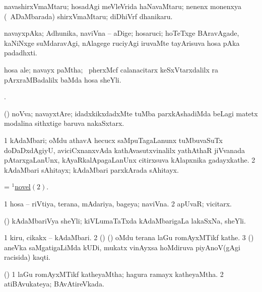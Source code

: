 \bentry
{}
\gl{\nA}
\bmng
navashirxVmaMtaru; hosadAgi meVleVrida haNavaMtaru; nenenx monenxya (\kanmu\ ADaMbarada) shirxVmaMtaru; diDhiVrf dhanikaru. 
\emng
\eentry

\bentry
{}
\gl{\nA}
\expl{\F}
\bmng
navayxpAka; Adhunika, naviVna -- aDige; hosaruci; hoTeTxge BAravAgade, kaNiNxge suMdaravAgi, nAlagege ruciyAgi iruvaMte tayArisuva hosa pAka padadhxti. 
\emng
\eentry

\bentry
{}
\gl{\nA}
\expl{\F}
\bmng
hosa ale; navayx paMtha; \kanmu\ pherxMcf calanacitarx keSxVtarxdalilx {}ra pArxraMBadalilx baMda hosa sheYli. 
\emng
\eentry

\bentry
{}
\gl{\saMkiSx}
\bmng
{}. 
\emng
\eentry

\bentry
{}
\gl{\nA}
\bmng
(\Kavi) noVva; navayxtAre; idadxkikxdadxMte tuMba parxkAshadiMda beLagi matetx modalina sithxtige baruva nakaSxtarx. 
\emng
\eentry

\bentry
{}
\gl{\nA}
\bmng
\bnum
\num{1} kAdaMbari; oMdu athavA hecucx saMpuTagaLanunx tuMbuvaSuTx doDaDxdAgiyU, aviciCxnanxvAda kathAvasutxvinalilx yathAthaR jiVvanada pAtarxgaLanUnx, kAyaRkalApagaLanUnx citirxsuva kAlapxnika gadayxkathe. 
\hypertarget{novel(1)2}{} 
\num{2} kAdaMbari sAhitayx; kAdaMbari parxkArada sAhitayx. 
\enum
\emng

\noindent
\gl{\pagu}
\bmng
{} = \hyperlink{novel(1)2}{$^1$novel\((2)\)}. 
\emng
\eentry

\bentry
{}
\gl{\gu}
\bmng
\bnum
\num{1} hosa -- riVtiya, terana, mAdariya, bageya; naviVna. 
\num{2} apUvaR; vicitarx. 
\enum
\emng
\eentry

\bentry
{}
\gl{\nA}
\bmng
(\hiV) kAdaMbariVya sheYli; kiVLumaTaTxda kAdaMbarigaLa lakaSxNa, sheYli. 
\emng
\eentry

\bentry
{}
\gl{\nA}
\bmng
\bnum
\num{1} kiru, cikakx -- kAdaMbari. 
\num{2} (\birx) (\hiV) oMdu terana laGu romAyxMTikf kathe. 
\num{3} (\saM) aneVka saMgatigaLiMda kUDi, mukatx vinAyxsa hoMdiruva piyAnoV(gAgi racisida) kaqti. 
\enum
\emng
\eentry

\bentry
{}
\gl{\gu}
\bmng
(\hiV) 
\bnum
\num{1} laGu romAyxMTikf katheyaMtha; hagura ramayx katheyaMtha. 
\num{2} atiBAvukateya; BAvAtireVkada. 
\enum
\emng
\eentry

